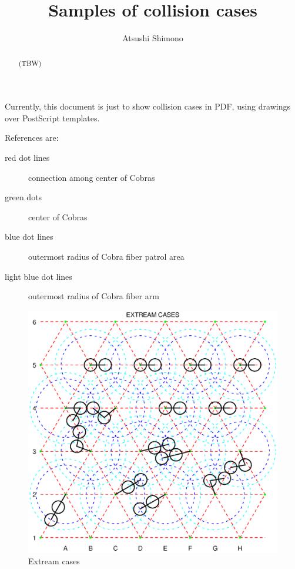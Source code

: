 \documentclass[a4paper,notitlepage]{article}
\title{Samples of collision cases}
\author{Atsushi Shimono}
\begin{document}
\drafttrue
{}
\SSNChangeRecord{
}

\ssnhead

\begin{abstract}
(TBW)
\end{abstract}

Currently, this document is just to show collision cases in PDF, 
using drawings over PostScript templates. 

References are:
\begin{description}
  \item[red dot lines] connection among center of Cobras
  \item[green dots] center of Cobras
  \item[blue dot lines] outermost radius of Cobra fiber patrol area
  \item[light blue dot lines] outermost radius of Cobra fiber arm
\end{description}


\begin{figure}[htb]
  \begin{center}
    \includegraphics{extream.eps}
  \end{center}
  \caption{Extream cases}
  \label{fig:extream}
\end{figure}
\end{document}
